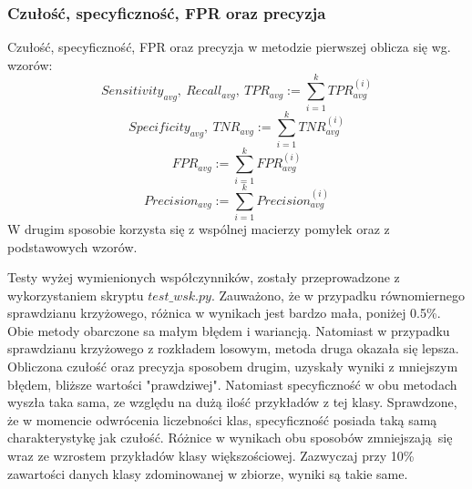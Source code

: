\subsubsection{Czułość, specyficzność, FPR oraz precyzja}
Czułość, specyficzność, FPR oraz precyzja w metodzie pierwszej oblicza się wg. wzorów:
\[Sensitivity_{avg},\ Recall_{avg},\ TPR_{avg} := \sum_{i=1}^{k} TPR_{avg}^{(i)}\]
\[Specificity_{avg},\ TNR_{avg} := \sum_{i=1}^{k} TNR_{avg}^{(i)}\]
\[FPR_{avg} := \sum_{i=1}^{k} FPR_{avg}^{(i)}\]
\[Precision_{avg} := \sum_{i=1}^{k} Precision_{avg}^{(i)}\]
W drugim sposobie korzysta się z wspólnej macierzy pomyłek oraz z podstawowych wzorów. \par
Testy wyżej wymienionych współczynników, zostały przeprowadzone z wykorzystaniem skryptu $test\_wsk.py$. Zauważono, że w przypadku równomiernego sprawdzianu krzyżowego, różnica w wynikach jest bardzo mała, poniżej 0.5\%. Obie metody obarczone sa małym błędem i wariancją. Natomiast w przypadku sprawdzianu krzyżowego z rozkładem losowym, metoda druga okazała się lepsza. Obliczona czułość oraz precyzja sposobem drugim, uzyskały wyniki z mniejszym błędem, bliższe wartości "prawdziwej". Natomiast specyficzność w obu metodach wyszła taka sama, ze względu na dużą ilość przykładów z tej klasy. Sprawdzone, że w momencie odwrócenia liczebności klas, specyficzność posiada taką samą charakterystykę jak czułość. Różnice w wynikach obu sposobów zmniejszają się wraz ze wzrostem przykładów klasy większościowej. Zazwyczaj przy 10\% zawartości danych klasy zdominowanej w zbiorze, wyniki są takie same.
